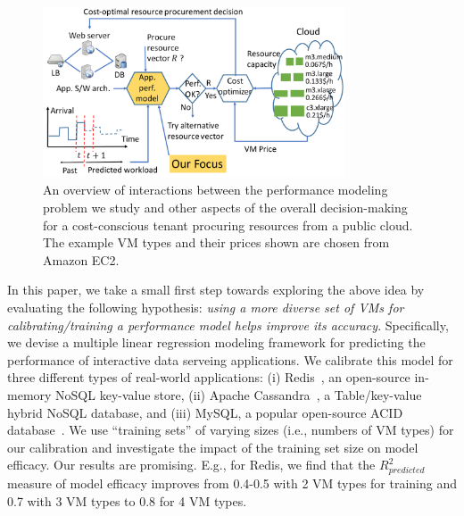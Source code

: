 
\begin{figure}[htbp]
\centering
\includegraphics[width=0.8\textwidth]{system}
\caption{An overview of interactions between the performance modeling problem we study and other aspects of the overall decision-making for a cost-conscious tenant procuring resources from a public cloud. The example VM types and their prices shown are chosen from Amazon EC2. }
\label{fig:diagram}
\end{figure}

 In this paper, we take a small first step towards exploring the above idea by evaluating the following hypothesis: {\em using a more diverse set of VMs for calibrating/training a performance model helps improve its accuracy}. Specifically, we devise a multiple linear regression modeling framework for predicting the performance of interactive data  serveing applications. We calibrate this model for three different types of real-world applications: (i) Redis~\cite{redis}, an open-source in-memory NoSQL key-value store, (ii) Apache Cassandra~\cite{cassandra}, a Table/key-value hybrid NoSQL database, and (iii) MySQL, a popular open-source ACID database~\cite{mysql}. We use ``training sets'' of varying sizes (i.e., numbers of VM types) for our calibration and investigate the impact of the training set size on model efficacy. Our results are promising. E.g., for Redis, we find that the $R^2_{predicted}$ measure of model efficacy improves from 0.4-0.5 with 2 VM types for training and 0.7 with 3 VM types to 0.8 for 4 VM types. 

